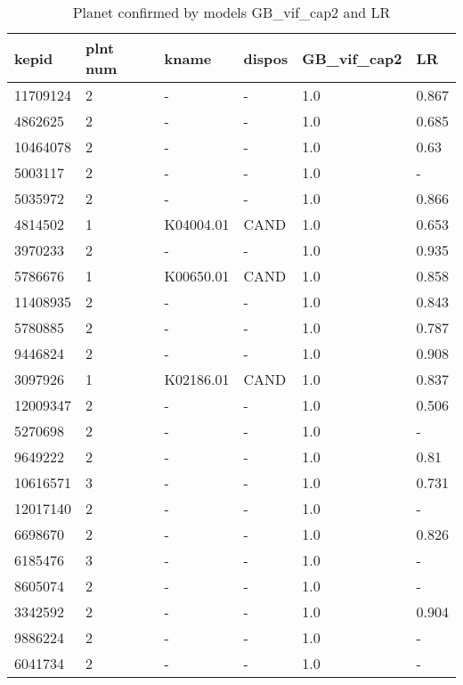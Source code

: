 \begin{table}[!htbp]
 \centering
 \caption{Planet confirmed by models GB\_vif\_cap2 and LR}
 \label{dataGBvifcap2LRcreftab} 
  \begin{tabular}
{| 
 p{}| 
 p{}| 
 p{}| 
 p{}| 
 p{}| 
 p{}| 
}\hline 
\textbf{kepid} &\textbf{plnt num} &\textbf{kname} &\textbf{dispos} &\textbf{GB\_vif\_cap2} &\textbf{LR} \\ \hline 
11709124 &2 &- &- &1.0 &0.867 \\ \hline 
4862625 &2 &- &- &1.0 &0.685 \\ \hline 
10464078 &2 &- &- &1.0 &0.63 \\ \hline 
5003117 &2 &- &- &1.0 &- \\ \hline 
5035972 &2 &- &- &1.0 &0.866 \\ \hline 
4814502 &1 &K04004.01 &CAND &1.0 &0.653 \\ \hline 
3970233 &2 &- &- &1.0 &0.935 \\ \hline 
5786676 &1 &K00650.01 &CAND &1.0 &0.858 \\ \hline 
11408935 &2 &- &- &1.0 &0.843 \\ \hline 
5780885 &2 &- &- &1.0 &0.787 \\ \hline 
9446824 &2 &- &- &1.0 &0.908 \\ \hline 
3097926 &1 &K02186.01 &CAND &1.0 &0.837 \\ \hline 
12009347 &2 &- &- &1.0 &0.506 \\ \hline 
5270698 &2 &- &- &1.0 &- \\ \hline 
9649222 &2 &- &- &1.0 &0.81 \\ \hline 
10616571 &3 &- &- &1.0 &0.731 \\ \hline 
12017140 &2 &- &- &1.0 &- \\ \hline 
6698670 &2 &- &- &1.0 &0.826 \\ \hline 
6185476 &3 &- &- &1.0 &- \\ \hline 
8605074 &2 &- &- &1.0 &- \\ \hline 
3342592 &2 &- &- &1.0 &0.904 \\ \hline 
9886224 &2 &- &- &1.0 &- \\ \hline 
6041734 &2 &- &- &1.0 &- \\ \hline 

\end{tabular}
\end{table}
